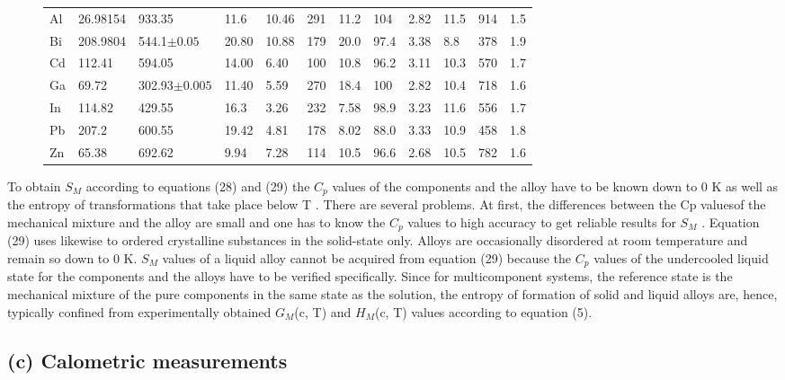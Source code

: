 \documentclass[12pt]{article}
\newcommand*{\1}{\hspace{1pt}}
\begin{document}
\begin{figure}
\begin{adjustwidth}{-1cm}{}
\begin{tabular}{|l | l | l | l | l | l | l | l | l | l | l | l|}
            
         \hline\hline
         Al & 26.98154 & 933.35           & 11.6  & 10.46 & 291 & 11.2 & 104  & 2.82 & 11.5 & 914 & 1.5 \\ 
         Bi & 208.9804 & 544.1$\pm 0.05$  & 20.80 & 10.88 & 179 & 20.0 & 97.4 & 3.38 & 8.8  & 378 & 1.9 \\
         Cd & 112.41   & 594.05           & 14.00 & 6.40  & 100 & 10.8 & 96.2 & 3.11 & 10.3 & 570 & 1.7 \\
         Ga & 69.72    & 302.93$\pm 0.005$& 11.40 & 5.59  & 270 & 18.4 & 100  & 2.82 & 10.4 & 718 & 1.6 \\
         In & 114.82   & 429.55           & 16.3  & 3.26  & 232 & 7.58 & 98.9 & 3.23 & 11.6 & 556 & 1.7 \\
         Pb & 207.2    & 600.55           & 19.42 & 4.81  & 178 & 8.02 & 88.0 & 3.33 & 10.9 & 458 & 1.8 \\
         Zn & 65.38    & 692.62           & 9.94  & 7.28  & 114 & 10.5 & 96.6 & 2.68 & 10.5 & 782 & 1.6 \\ [1ex] 
         \hline
         \end{tabular}
        \end{adjustwidth}
    \end{figure}


To obtain $S _M$ according to equations (28) and (29) the $C _p$ values of the components and the
alloy have to be known down to 0 K as well as the entropy of transformations that take
place below T . There are several problems. At first, the differences between the Cp valuesof the mechanical mixture and the alloy are small and one has to know the $ C _p$ values to 
high accuracy to get reliable results for $S _M$ . Equation (29) uses likewise to ordered
crystalline substances in the solid-state only. Alloys are occasionally disordered at room
temperature and remain so down to 0 K. $S _M$ values of a liquid alloy cannot be acquired from
equation (29) because the $C _p $  values of the undercooled liquid state for the components and
the alloys have to be verified specifically. Since for multicomponent systems, the reference 
state is the mechanical mixture of the pure components in the same state as the solution,
the entropy of formation of solid and liquid alloys are, hence, typically confined from
experimentally obtained $ G _M$(c, T) and $ H _M $(c, T) values according to equation (5).


\subsection*{(c) Calometric measurements}
\end{document}
